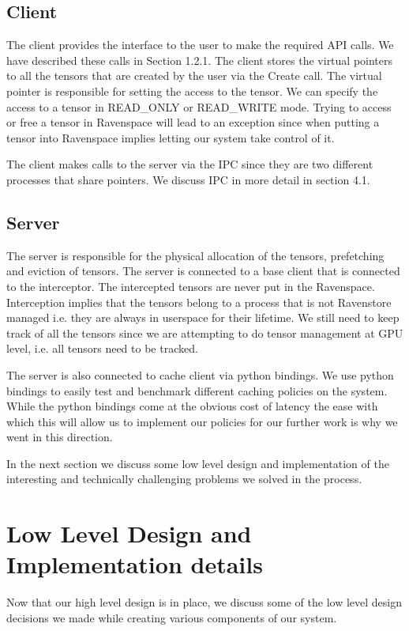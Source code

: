 \documentclass{article}
\begin{document}
\subsection{Client}
The client provides the interface to the user to make the required API calls. We have described these calls in Section 1.2.1.
The client stores the virtual pointers to all the tensors that are created by the user via the Create call. The virtual pointer is
responsible for setting the access to the tensor. We can specify the access to a tensor in READ\_ONLY or READ\_WRITE mode. 
Trying to access or free a tensor in Ravenspace will lead to an exception since when putting a tensor into Ravenspace implies letting our
system take control of it.

The client makes calls to the server via the IPC since they are two different processes that share pointers. We discuss IPC in more detail in section 4.1.

\subsection{Server}
The server is responsible for the physical allocation of the tensors, prefetching and eviction of tensors.
The server is connected to a base client that is connected to the interceptor. The intercepted tensors are
never put in the Ravenspace. Interception implies that the tensors belong to a process that is not Ravenstore managed i.e.
they are always in userspace for their lifetime.
We still need to keep track of all the tensors since we are attempting to do tensor management at GPU level, i.e. all tensors
need to be tracked.

The server is also connected to cache client via python bindings. We use python bindings to easily test and benchmark different
caching policies on the system. While the python bindings come at the obvious cost of latency the ease with which this will allow us 
to implement our policies for our further work is why we went in this direction.

In the next section we discuss some low level design and implementation
of the interesting and technically challenging problems we solved in the process.


\section{Low Level Design and Implementation details}


Now that our high level design is in place, we discuss some of the low level design decisions we made
while creating various components of our system.
\end{document}
